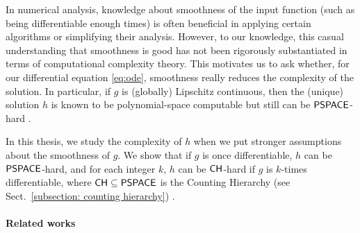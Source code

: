 In numerical analysis, 
knowledge about smoothness of the input function 
(such as being differentiable enough times) 
is often beneficial 
in applying certain algorithms or simplifying their analysis.
However, to our knowledge, 
this casual understanding that smoothness is good 
has not been rigorously substantiated 
in terms of computational complexity theory. 
This motivates us to ask whether, 
for our differential equation \eqref{eq:ode}, 
smoothness really reduces the complexity of the solution. 
In particular, if $g$ is (globally) Lipschitz continuous, 
then the (unique) solution $h$ is known to be 
polynomial-space computable but still can be 
$\mathsf{PSPACE}$-hard \cite{kawamura2010lipschitz}. 

In this thesis, we study the complexity of $h$ 
when we put stronger assumptions about the smoothness of $g$. 
We show that if $g$ is once differentiable,
$h$ can be $\mathsf{PSPACE}$-hard, and for each integer $k$, 
$h$ can be $\mathsf{CH}$-hard if $g$ is $k$-times differentiable,
where $\mathsf{CH} \subseteq \mathsf{PSPACE}$ is the Counting Hierarchy 
(see Sect.~\ref{subsection: counting hierarchy}) \cite{kawamura2012computational}. 




\paragraph{Related works}

